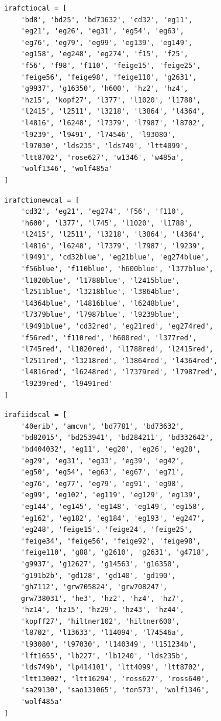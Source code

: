 \documentclass[fleqn,usenatbib]{mnras}
\begin{document}
\begin{verbatim}
irafctiocal = [
    'bd8', 'bd25', 'bd73632', 'cd32', 'eg11',
    'eg21', 'eg26', 'eg31', 'eg54', 'eg63',
    'eg76', 'eg79', 'eg99', 'eg139', 'eg149',
    'eg158', 'eg248', 'eg274', 'f15', 'f25',
    'f56', 'f98', 'f110', 'feige15', 'feige25',
    'feige56', 'feige98', 'feige110', 'g2631',
    'g9937', 'g16350', 'h600', 'hz2', 'hz4',
    'hz15', 'kopf27', 'l377', 'l1020', 'l1788',
    'l2415', 'l2511', 'l3218', 'l3864', 'l4364',
    'l4816', 'l6248', 'l7379', 'l7987', 'l8702',
    'l9239', 'l9491', 'l74546', 'l93080',
    'l97030', 'lds235', 'lds749', 'ltt4099',
    'ltt8702', 'rose627', 'w1346', 'w485a',
    'wolf1346', 'wolf485a'
]
\end{verbatim}

\begin{verbatim}
irafctionewcal = [
    'cd32', 'eg21', 'eg274', 'f56', 'f110',
    'h600', 'l377', 'l745', 'l1020', 'l1788',
    'l2415', 'l2511', 'l3218', 'l3864', 'l4364',
    'l4816', 'l6248', 'l7379', 'l7987', 'l9239',
    'l9491', 'cd32blue', 'eg21blue', 'eg274blue',
    'f56blue', 'f110blue', 'h600blue', 'l377blue',
    'l1020blue', 'l1788blue', 'l2415blue',
    'l2511blue', 'l3218blue', 'l3864blue',
    'l4364blue', 'l4816blue', 'l6248blue',
    'l7379blue', 'l7987blue', 'l9239blue',
    'l9491blue', 'cd32red', 'eg21red', 'eg274red',
    'f56red', 'f110red', 'h600red', 'l377red',
    'l745red', 'l1020red', 'l1788red', 'l2415red',
    'l2511red', 'l3218red', 'l3864red', 'l4364red',
    'l4816red', 'l6248red', 'l7379red', 'l7987red',
    'l9239red', 'l9491red'
]
\end{verbatim}

\begin{verbatim}
irafiidscal = [
    '40erib', 'amcvn', 'bd7781', 'bd73632',
    'bd82015', 'bd253941', 'bd284211', 'bd332642',
    'bd404032', 'eg11', 'eg20', 'eg26', 'eg28',
    'eg29', 'eg31', 'eg33', 'eg39', 'eg42',
    'eg50', 'eg54', 'eg63', 'eg67', 'eg71',
    'eg76', 'eg77', 'eg79', 'eg91', 'eg98',
    'eg99', 'eg102', 'eg119', 'eg129', 'eg139',
    'eg144', 'eg145', 'eg148', 'eg149', 'eg158',
    'eg162', 'eg182', 'eg184', 'eg193', 'eg247',
    'eg248', 'feige15', 'feige24', 'feige25',
    'feige34', 'feige56', 'feige92', 'feige98',
    'feige110', 'g88', 'g2610', 'g2631', 'g4718',
    'g9937', 'g12627', 'g14563', 'g16350',
    'g191b2b', 'gd128', 'gd140', 'gd190',
    'gh7112', 'grw705824', 'grw708247',
    grw738031', 'he3', 'hz2', 'hz4', 'hz7',
    'hz14', 'hz15', 'hz29', 'hz43', 'hz44',
    'kopff27', 'hiltner102', 'hiltner600',
    'l8702', 'l13633', 'l14094', 'l74546a',
    'l93080', 'l97030', 'l140349', 'l151234b',
    'lft1655', 'lb227', 'lb1240', 'lds235b',
    'lds749b', 'lp414101', 'ltt4099', 'ltt8702',
    'ltt13002', 'ltt16294', 'ross627', 'ross640',
    'sa29130', 'sao131065', 'ton573', 'wolf1346',
    'wolf485a'
]
\end{verbatim}
\end{document}
